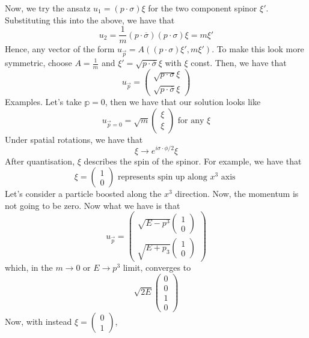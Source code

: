 Now, we try the ansatz $ u _ 1 = ( p \cdot  \sigma ) \xi $ for the 
two component spinor $ \xi ' $. 
Substituting this into the above, 
we have that 
\[
u _ 2 = \frac{1}{m} ( p \cdot  \overline{ \sigma } ) ( p \cdot  \sigma ) \xi = m \xi ' 
\] Hence, 
any vector of the form $ u _{ \vec{p} }  = A ( ( p \cdot  \sigma ) \xi ' , m \xi ' ) $. 
To make this look more symmetric, choose $ A = \frac{1}{m } $  and 
$ \xi '  = \sqrt{ p \cdot  \overline{ \sigma } }  \xi $  with $ \xi $ const. 
Then, we have that 
\[
u _{ \vec{p} }  = \begin{pmatrix}  \sqrt{ p \cdot  \sigma }  \xi \\
\sqrt{ p \cdot  \overline{ \sigma }   } \xi  \end{pmatrix}  
\]  
Examples. Let's take $ \mathbb{p } = 0$, then we have 
that our solution looks like 
\[
u_{ \vec{p} = 0 }  = \sqrt{ m }  \begin{pmatrix}  \xi \\ \xi  \end{pmatrix} \text{ for any } \xi 
\] Under spatial rotations, we have that 
\[
\xi \to e ^{ i \sigma \cdot  \phi  / 2 } \xi 
\] After quantisation, $ \xi $ describes the spin of the spinor. 
For example, we have that 
\[
\xi = \begin{pmatrix}  1 \\ 0  \end{pmatrix}  \text{ represents spin up along } x ^ 3 \text{ axis }
\] Let's consider a particle boosted along the $ x ^ 3 $ direction. 
Now, the momentum is not going to be zero. 
Now what we have is that 
\[
u_{ \vec{p} }  = \begin{pmatrix}  \sqrt{ E - p ^ 3 }  \begin{pmatrix}  1 \\ 0  \end{pmatrix} 
\\ \sqrt{ E + p_3 }  \begin{pmatrix}  1 \\ 0  \end{pmatrix}  \end{pmatrix} 
\] which, in the $ m \to 0 $ or $ E \to p^ 3 $ limit, converges to 
\[
\sqrt{ 2 E }  \begin{pmatrix}  0 \\ 0 \\ 1 \\ 0  \end{pmatrix} 
\] Now, with instead $ \xi  = \begin{pmatrix}  0 \\ 1  \end{pmatrix}  $, 
